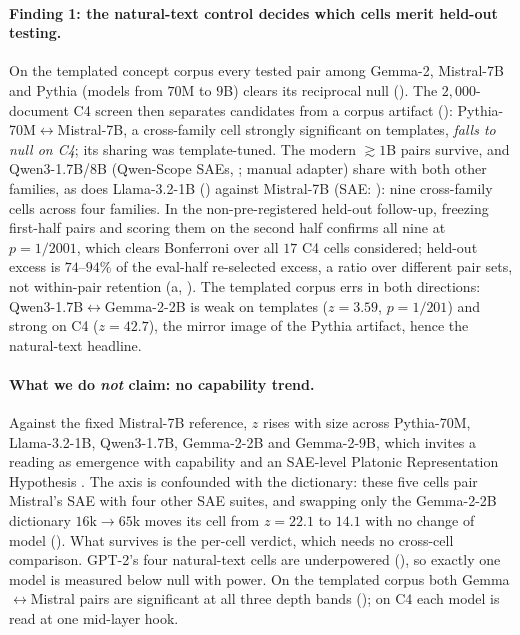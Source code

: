 \paragraph{Finding 1: the natural-text control decides which cells merit held-out testing.} On
the templated concept corpus every tested pair among Gemma-2, Mistral-7B and Pythia (models from $70$M to $9$B)
clears its reciprocal null (). The $2{,}000$-document C4 screen
\citep{raffel2020exploring} then separates candidates from a corpus artifact
(): Pythia-70M$\leftrightarrow$Mistral-7B, a cross-family cell strongly
significant on templates, \emph{falls to null on C4}; its sharing was template-tuned. The
modern ${\gtrsim}1$B pairs survive, and Qwen3-1.7B/8B (Qwen-Scope SAEs, \citealp{qwenscope2026};
manual adapter) share with both other families, as does Llama-3.2-1B
(\citealp{chanind2024llamasae}) against Mistral-7B (SAE: \citealp{engels2024mistralsae}): nine
cross-family cells across four families. In the non-pre-registered held-out follow-up, freezing
first-half pairs and scoring them on the second half confirms all nine at
$p=1/2001$, which clears Bonferroni over all $17$ C4 cells considered; held-out excess is
$74$--$94\%$ of the eval-half re-selected excess, a ratio over different pair sets, not
within-pair retention (a, ). The templated corpus errs in both
directions: Qwen3-1.7B$\leftrightarrow$Gemma-2-2B is weak on templates ($z=3.59$, $p=1/201$) and strong on C4 ($z=42.7$), the
mirror image of the Pythia artifact, hence the natural-text headline.

\paragraph{What we do \emph{not} claim: no capability trend.} Against the fixed Mistral-7B
reference, $z$ rises with size across Pythia-70M, Llama-3.2-1B, Qwen3-1.7B, Gemma-2-2B and
Gemma-2-9B, which invites a reading as emergence with
capability and an SAE-level Platonic Representation Hypothesis \citep{huh2024platonic}. The axis
is confounded with the dictionary: these five cells pair Mistral's SAE with four other SAE suites, and
swapping only the Gemma-2-2B dictionary $16$k$\to$$65$k moves its cell from $z=22.1$ to $14.1$
with no change of model (). What survives is the per-cell verdict, which
needs no cross-cell comparison. GPT-2's four natural-text cells are underpowered (), so exactly one model is measured below null with power. On the
templated corpus both Gemma$\leftrightarrow$Mistral pairs are significant at all three depth bands
(); on C4 each model is read at one mid-layer hook.

